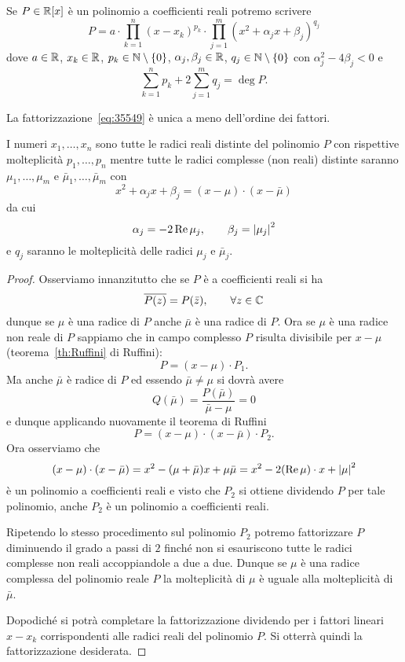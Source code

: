 \begin{theorem}
  \label{th:fattorizzazione_polinomio_reale}%
Se $P\in {\mathbb R}[x]$ è un polinomio a coefficienti reali
potremo scrivere
\begin{equation}\label{eq:35549}
  P = a \cdot \prod_{k=1}^n (x-x_k)^{p_k} \cdot \prod_{j=1}^m (x^2 + \alpha_j x + \beta_j)^{q_j}
\end{equation}
dove $a\in {\mathbb R}$, $x_k\in {\mathbb R}$, $p_k\in {\mathbb N}\setminus{\left\{ 0 \right\}}$,
$\alpha_j,\beta_j\in {\mathbb R}$, $q_j\in {\mathbb N}\setminus{\left\{ 0 \right\}}$
con $\alpha_j^2 - 4 \beta_j < 0$
e
\[
  \sum_{k=1}^n p_k + 2 \sum_{j=1}^m q_j = \deg P.
\]

La fattorizzazione~\eqref{eq:35549} è unica a meno
dell'ordine dei fattori.

I numeri $x_1,\dots,x_n$ sono tutte le radici reali distinte
del polinomio $P$ con rispettive molteplicità
$p_1,\dots,p_n$ mentre tutte le radici complesse (non reali)
distinte saranno $\mu_1,\dots, \mu_m$
e $\bar \mu_1, \dots, \bar \mu_m$ con
\[
  x^2 + \alpha_j x + \beta_j = (x-\mu)\cdot(x-\bar \mu)
\]
da cui
\[
  \alpha_j = -2\operatorname{Re} \mu_j, \qquad \beta_j={\left|\mu_j\right|}^2
\]
e $q_j$ saranno le molteplicità delle radici $\mu_j$
 e $\bar \mu_j$.
\end{theorem}
%
\begin{proof}
Osserviamo innanzitutto che se $P$ è a coefficienti reali
si ha
\[
  \overline{P(z)} = P(\bar z), \qquad \forall z\in {\mathbb C}
\]
dunque se $\mu$ è una radice di $P$ anche $\bar \mu$
è una radice di $P$.
Ora se $\mu$ è una radice non reale di $P$ sappiamo
che in campo complesso $P$ risulta divisibile
per $x-\mu$ (teorema~\ref{th:Ruffini} di Ruffini):
\[
  P = (x-\mu) \cdot P_1.
\]
Ma anche $\bar \mu$ è radice di $P$ ed essendo
$\bar \mu \neq \mu$ si dovrà avere
\[
Q(\bar \mu) = \frac{P(\bar \mu)}{\bar \mu - \mu} = 0
\]
e dunque applicando nuovamente il teorema di Ruffini
\[
 P = (x-\mu)\cdot (x-\bar \mu)\cdot P_2.
\]
Ora osserviamo che
\[
(x-\mu)\cdot(x-\bar \mu) = x^2 - (\mu + \bar \mu) x + \mu \bar \mu
 = x^2 - 2 (\operatorname{Re} \mu)\cdot x + {\left|\mu\right|}^2
\]
è un polinomio a coefficienti reali e
visto che $P_2$ si ottiene dividendo $P$ per tale polinomio,
anche $P_2$ è un polinomio a coefficienti reali.

Ripetendo lo stesso procedimento sul polinomio $P_2$
potremo fattorizzare $P$ diminuendo il grado a passi
di $2$ finché non si esauriscono tutte le radici complesse
non reali accoppiandole a due a due.
Dunque se $\mu$ è una radice complessa
del polinomio reale $P$ la molteplicità di $\mu$ è
uguale alla molteplicità di $\bar \mu$.

Dopodiché
si potrà completare la fattorizzazione dividendo
per i fattori lineari $x-x_k$ corrispondenti
alle radici reali del polinomio $P$.
Si otterrà quindi la fattorizzazione desiderata.
\end{proof}
